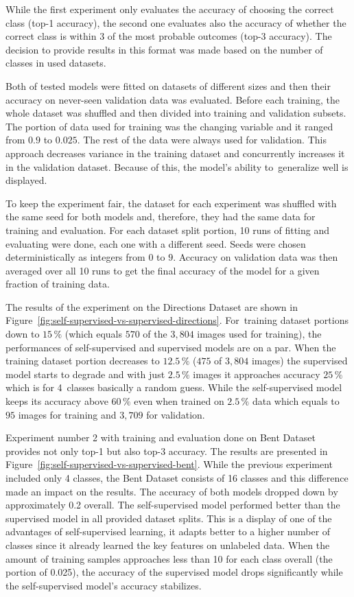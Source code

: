 While the first experiment only evaluates the accuracy of choosing the correct class (top-1 accuracy), the second one evaluates also the accuracy of whether the correct class is within 3 of the most probable outcomes (top-3 accuracy). The decision to provide results in this format was made based on the number of classes in used datasets.

Both of tested models were fitted on datasets of different sizes and then their accuracy on never-seen validation data was evaluated. Before each training, the whole dataset was shuffled and then divided into training and validation subsets. The portion of data used for training was the changing variable and it ranged from $0.9$ to $0.025$. The rest of the data were always used for validation. This approach decreases variance in the training dataset and concurrently increases it in the validation dataset. Because of this, the model's ability to~generalize well is displayed.

To keep the experiment fair, the dataset for each experiment was shuffled with the same seed for both models and, therefore, they had the same data for training and evaluation. For each dataset split portion, 10 runs of fitting and evaluating were done, each one with a different seed. Seeds were chosen deterministically as integers from $0$ to $9$. Accuracy on validation data was then averaged over all 10 runs to get the final accuracy of the model for a given fraction of training data.

The results of the experiment on the Directions Dataset are shown in Figure~\ref{fig:self-supervised-vs-supervised-directions}. For~training dataset portions down to $15\,\%$ (which equals $570$ of the $3{,}804$ images used for training), the performances of self-supervised and supervised models are on a par. When the training dataset portion decreases to $12.5\,\%$ ($475$ of $3{,}804$ images) the supervised model starts to degrade and with just $2.5\,\%$ images it approaches accuracy $25\,\%$ which is for 4~classes basically a random guess. While the self-supervised model keeps its accuracy above $60\,\%$ even when trained on $2.5\,\%$ data which equals to $95$ images for training and $3{,}709$ for validation.

Experiment number 2 with training and evaluation done on Bent Dataset provides not only top-1 but also top-3 accuracy. The results are presented in Figure~\ref{fig:self-supervised-vs-supervised-bent}. While the previous experiment included only 4 classes, the Bent Dataset consists of 16 classes and this difference made an impact on the results. The accuracy of both models dropped down by approximately 0.2 overall. The self-supervised model performed better than the supervised model in all provided dataset splits. This is a display of one of the advantages of self-supervised learning, it adapts better to a higher number of classes since it already learned the key features on unlabeled data. When the amount of training samples approaches less than 10 for each class overall (the portion of 0.025), the accuracy of the supervised model drops significantly while the self-supervised model's accuracy stabilizes.

